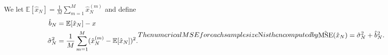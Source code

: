 \documentclass{article}
\newcommand{\E}{\mathbb{E}}
\begin{document}
We let $\E[\hat{x}_N] = \frac{1}{M}\sum_{m=1}^{M}\hat{x}_N^{(m)}$ and define
%
%
\begin{subequations}
	\begin{align}
	\hat{b}_N &= \E[\hat{x}_N] - x\\
	\hat{\sigma}^2_N &= \frac{1}{M}\sum_{m=1}^{M}(\hat{x}_N^{(m)}-\E[\hat{x}_N])^2.
	\end{align}
	
	The numerical MSE for each sample size $N$ is then computed by
	\begin{align}
	\hat{\mathrm{MSE}}(\hat{x}_N) = \hat{\sigma}^2_N + \hat{b}_N^2.
	\end{align}
\end{subequations}
%
%
\begin{figure}[t]
	\centering
	\begin{minipage}[t]{0.47\linewidth}
		

\end{minipage}
\end{figure}
\end{document}
